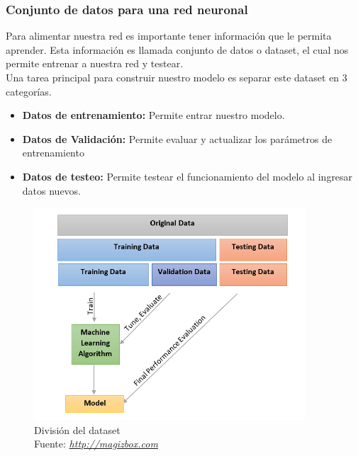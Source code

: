 \subsubsection{Conjunto de datos para una red neuronal}
Para alimentar nuestra red es importante tener información que le permita aprender. Esta información es llamada conjunto de datos o dataset, el cual nos permite entrenar a nuestra red y testear.\\ Una tarea principal para construir nuestro modelo es separar este dataset en 3 categorías.
\begin{itemize}
	\item \textbf{Datos de entrenamiento:} Permite entrar nuestro modelo.
	\item \textbf{Datos de Validación:} Permite evaluar y actualizar los parámetros de entrenamiento
	\item \textbf{Datos de testeo:} Permite testear el funcionamiento del modelo al ingresar datos nuevos.
\end{itemize}

\begin{figure}[H]
	\centering
	\includegraphics[width=0.9\textwidth]{Figures/validation.PNG}
	\caption{División del dataset \\ Fuente:  \href{http://magizbox.com/training/machinelearning/site/evaluation/}{\textit{http://magizbox.com}}}
	\label{validacion}
\end{figure} 







\afterpage{\blankpage}